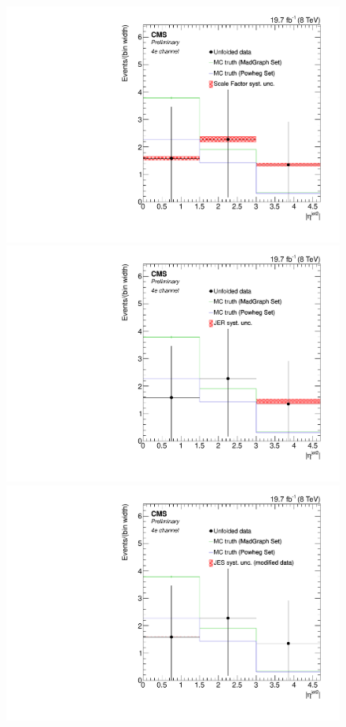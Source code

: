 \begin{figure}[hbtp]
\begin{center}
   \includegraphics[width=0.8\cmsFigWidth]{Figures/Unfolding/Systematics/ZZTo4e_EtaJet2_SFSq_Mad_fr}
   \includegraphics[width=0.8\cmsFigWidth]{Figures/Unfolding/Systematics/ZZTo4e_EtaJet2_JER_Mad_fr}
   \includegraphics[width=0.8\cmsFigWidth]{Figures/Unfolding/Systematics/ZZTo4e_EtaJet2_JES_ModData_Mad_fr}     

\end{center}
\end{figure}
